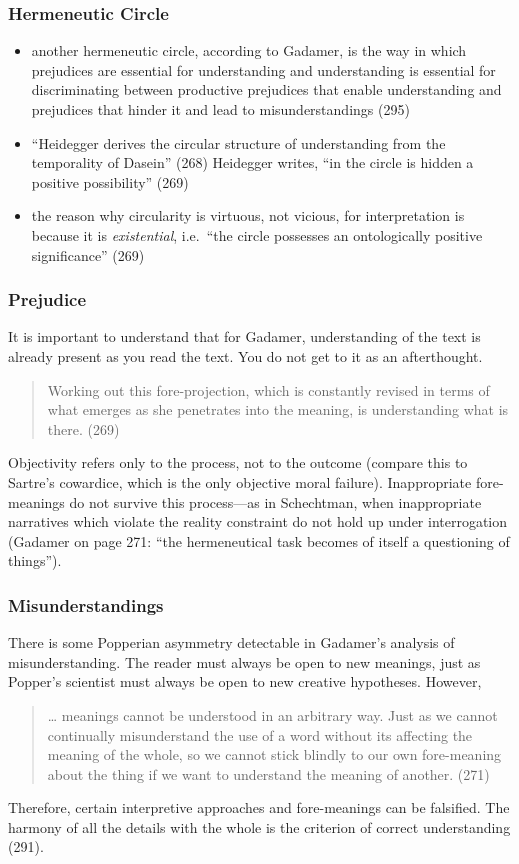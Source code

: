 \documentclass[xcolor=dvipsnames]{beamer}
\begin{document}
\begin{frame}
  \frametitle{Hermeneutic Circle}
  \begin{itemize}
  \item another hermeneutic circle, according to Gadamer, is the way
    in which prejudices are essential for understanding and
    understanding is essential for discriminating between productive prejudices
    that enable understanding and prejudices that hinder it and lead
    to misunderstandings (295)
  \item ``Heidegger derives the circular structure of understanding
    from the temporality of Dasein'' (268) Heidegger writes, ``in the
    circle is hidden a positive possibility'' (269)
  \item the reason why circularity is virtuous, not vicious, for
    interpretation is because it is \emph{existential}, i.e.\ ``the
    circle possesses an ontologically positive significance'' (269)
  \end{itemize}
\end{frame}

\begin{frame}
  \frametitle{Prejudice}
  It is important to understand that for Gadamer, understanding of the
  text is already present as you read the text. You do not get to it
  as an afterthought. 
  \begin{quote}
    Working out this fore-projection, which is constantly revised in
    terms of what emerges as she penetrates into the meaning, is
    understanding what is there. (269)
  \end{quote}
  Objectivity refers only to the process, not to the outcome (compare
  this to Sartre's cowardice, which is the only objective moral
  failure). Inappropriate fore-meanings do not survive this
  process---as in Schechtman, when inappropriate narratives which
  violate the reality constraint do not hold up under interrogation
  (Gadamer on page 271: ``the hermeneutical task becomes of itself a
  questioning of things'').
\end{frame}

\begin{frame}
  \frametitle{Misunderstandings}
  There is some Popperian asymmetry detectable in Gadamer's analysis
  of misunderstanding. The reader must always be open to new meanings,
  just as Popper's scientist must always be open to new creative
  hypotheses. However,
  \begin{quote}
    {\ldots} meanings cannot be understood in an arbitrary way. Just
    as we cannot continually misunderstand the use of a word without
    its affecting the meaning of the whole, so we cannot stick blindly
    to our own fore-meaning about the thing if we want to understand
    the meaning of another. (271)
  \end{quote}
  Therefore, certain interpretive approaches and fore-meanings can be
  falsified. The harmony of all the details with the whole is the
  criterion of correct understanding (291).
\end{frame}
\end{document}
